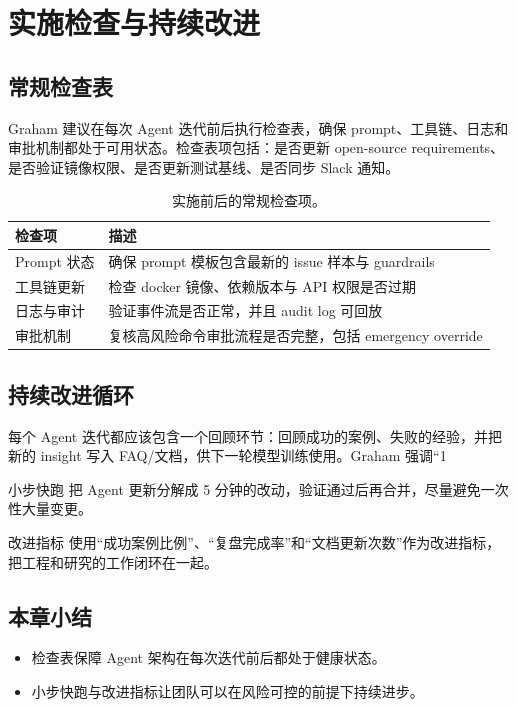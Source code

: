 \documentclass[a4paper]{article}
\begin{document}
\section{实施检查与持续改进}
\subsection{常规检查表}
Graham 建议在每次 Agent 迭代前后执行检查表，确保 prompt、工具链、日志和审批机制都处于可用状态。检查表项包括：是否更新 open-source requirements、是否验证镜像权限、是否更新测试基线、是否同步 Slack 通知。

\begin{table}[H]
\centering
\begin{tabular}{p{} p{}}
\toprule
检查项 & 描述 \\
\midrule
Prompt 状态 & 确保 prompt 模板包含最新的 issue 样本与 guardrails \\
\midrule
工具链更新 & 检查 docker 镜像、依赖版本与 API 权限是否过期 \\
\midrule
日志与审计 & 验证事件流是否正常，并且 audit log 可回放 \\
\midrule
审批机制 & 复核高风险命令审批流程是否完整，包括 emergency override \\
\bottomrule
\end{tabular}
\caption{实施前后的常规检查项。}
\end{table}

\subsection{持续改进循环}
每个 Agent 迭代都应该包含一个回顾环节：回顾成功的案例、失败的经验，并把新的 insight 写入 FAQ/文档，供下一轮模型训练使用。Graham 强调“1%

\begin{importantbox}{小步快跑}
把 Agent 更新分解成 5 分钟的改动，验证通过后再合并，尽量避免一次性大量变更。
\end{importantbox}

\begin{knowledgebox}{改进指标}
使用“成功案例比例”、“复盘完成率”和“文档更新次数”作为改进指标，把工程和研究的工作闭环在一起。
\end{knowledgebox}

\subsection{本章小结}
\begin{itemize}
    \item 检查表保障 Agent 架构在每次迭代前后都处于健康状态。
    \item 小步快跑与改进指标让团队可以在风险可控的前提下持续进步。
\end{itemize}
\end{document}
